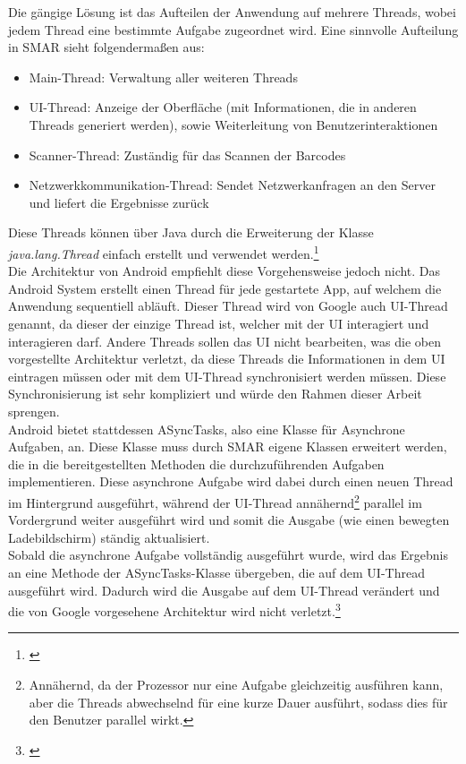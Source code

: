 Die gängige Lösung ist das Aufteilen der Anwendung auf mehrere Threads, wobei jedem Thread eine bestimmte Aufgabe zugeordnet wird. Eine sinnvolle Aufteilung in \ac{SMAR} sieht folgendermaßen aus:
\begin{itemize}
	\item Main-Thread: Verwaltung aller weiteren Threads
	\item UI-Thread: Anzeige der Oberfläche (mit Informationen, die in anderen Threads generiert werden), sowie Weiterleitung von Benutzerinteraktionen
	\item Scanner-Thread: Zuständig für das Scannen der Barcodes
	\item Netzwerkkommunikation-Thread: Sendet Netzwerkanfragen an den Server und liefert die Ergebnisse zurück
\end{itemize}
Diese Threads können über Java durch die Erweiterung der Klasse \textit{java.lang.Thread} einfach erstellt und verwendet werden.\footnote{\citep[S. 18ff.]{java_threads}}\\

Die Architektur von Android empfiehlt diese Vorgehensweise jedoch nicht. Das Android System erstellt einen Thread für jede gestartete App, auf welchem die Anwendung sequentiell abläuft. Dieser Thread wird von Google auch UI-Thread genannt, da dieser der einzige Thread ist, welcher mit der \ac{UI} interagiert und interagieren darf. Andere Threads sollen das \ac{UI} nicht bearbeiten, was die oben vorgestellte Architektur verletzt, da diese Threads die Informationen in dem \ac{UI} eintragen müssen oder mit dem UI-Thread synchronisiert werden müssen. Diese Synchronisierung ist sehr kompliziert und würde den Rahmen dieser Arbeit sprengen.\\

Android bietet stattdessen \glqq ASyncTasks\grqq , also eine Klasse für Asynchrone Aufgaben, an. Diese Klasse muss durch \ac{SMAR} eigene Klassen erweitert werden, die in die bereitgestellten Methoden die durchzuführenden Aufgaben implementieren. Diese asynchrone Aufgabe wird dabei durch einen neuen Thread im Hintergrund ausgeführt, während der UI-Thread  annähernd\footnote{Annähernd, da der Prozessor nur eine Aufgabe gleichzeitig ausführen kann, aber die Threads abwechselnd für eine kurze Dauer ausführt, sodass dies für den Benutzer parallel wirkt.} parallel im Vordergrund weiter ausgeführt wird und somit die Ausgabe (wie \zB einen bewegten Ladebildschirm) ständig aktualisiert.\\
Sobald die asynchrone Aufgabe vollständig ausgeführt wurde, wird das Ergebnis an eine Methode der ASyncTasks-Klasse übergeben, die auf dem UI-Thread ausgeführt wird. Dadurch wird  die Ausgabe auf dem UI-Thread verändert und die von Google vorgesehene Architektur wird nicht verletzt.\footnote{\citep[S. 115ff.]{android_threads}}

